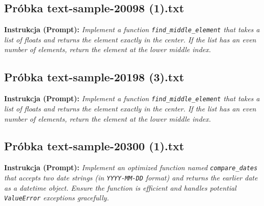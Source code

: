 


\subsection{Próbka text-sample-20098 (1).txt}
\label{sec:lst:text-sample-20098-1}
\textbf{Instrukcja (Prompt):} \textit{Implement a function \texttt{find\_middle\_element} that takes a list of floats and returns the element exactly in the center. If the list has an even number of elements, return the element at the lower middle index.}




\subsection{Próbka text-sample-20198 (3).txt}
\label{sec:lst:text-sample-20198-3}
\textbf{Instrukcja (Prompt):} \textit{Implement a function \texttt{find\_middle\_element} that takes a list of floats and returns the element exactly in the center. If the list has an even number of elements, return the element at the lower middle index.}




\subsection{Próbka text-sample-20300 (1).txt}
\label{sec:lst:text-sample-20300-1}
\textbf{Instrukcja (Prompt):} \textit{Implement an optimized function named \texttt{compare\_dates} that accepts two date strings (in \texttt{YYYY-MM-DD} format) and returns the earlier date as a datetime object. Ensure the function is efficient and handles potential \texttt{ValueError} exceptions gracefully.}



